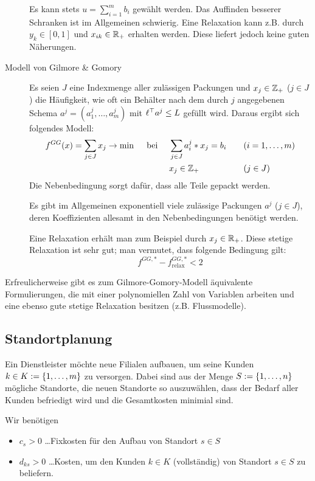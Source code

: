 \begin{description}
	Es kann stets $u = \sum_{i=1}^m b_i$ gewählt werden. Das Auffinden besserer Schranken ist im Allgemeinen schwierig.
	Eine Relaxation kann z.B. durch $y_k \in [0,1]$ und $x_{ik} \in \mathbb{R}_+$ erhalten werden. Diese liefert jedoch keine guten Näherungen.
	\item[Modell von Gilmore \& Gomory] Es seien $J$ eine Indexmenge aller zulässigen Packungen und $x_j \in \mathbb{Z}_+$ ($j \in J$) die Häufigkeit, wie oft ein Behälter nach dem durch $j$ angegebenen Schema $a^j = (a_1^j , \dots , a_m^j)$ mit $\ell^{\top} a^j \le L$ gefüllt wird.
	Daraus ergibt sich folgendes Modell:
	\begin{equation*}
		\begin{aligned}
		f^{GG}(x) = \sum_{j \in J} x_j \to \min \quad \text{ bei } \quad 
		& \sum_{j \in J} a_i^j * x_j = b_i \quad && (i = 1, \dots , m) \\
		& x_j \in \mathbb{Z}_+ && (j \in J)
		\end{aligned}
	\end{equation*}
	Die Nebenbedingung sorgt dafür, dass alle Teile gepackt werden.
	
	Es gibt im Allgemeinen exponentiell viele zulässige Packungen $a^j$ ($j \in J$), deren Koeffizienten allesamt in den Nebenbedingungen benötigt werden.
	
	Eine Relaxation erhält man zum Beispiel durch $x_j \in \mathbb{R}_+$. Diese stetige Relaxation ist sehr gut; man vermutet, dass folgende Bedingung gilt:
	\begin{equation*}
		f^{GG, \ast} - f^{GG, \ast}_\text{relax} < 2
	\end{equation*}
\end{description}

Erfreulicherweise gibt es zum Gilmore-Gomory-Modell äquivalente Formulierungen, die mit einer polynomiellen Zahl von Variablen arbeiten und eine ebenso gute stetige Relaxation besitzen (z.B. Flussmodelle).


\subsection{Standortplanung}
Ein Dienstleister möchte neue Filialen aufbauen, um seine Kunden $k \in K \mathrel{:=} \left\{ 1, \dots , m \right\}$ zu versorgen. Dabei sind aus der Menge $S \mathrel{:=} \left\{ 1, \dots , n \right\}$ mögliche Standorte, die neuen Standorte so auszuwählen, dass der Bedarf aller Kunden befriedigt wird und die Gesamtkosten minimial sind.

Wir benötigen
\begin{itemize}[nolistsep, topsep=-\parskip]
	\item $c_s > 0$ \dots Fixkosten für den Aufbau von Standort $s \in S$
	\item $d_{ks} > 0$ \dots Kosten, um den Kunden $k \in K$ (vollständig) von Standort $s \in S$ zu beliefern.
\end{itemize}

